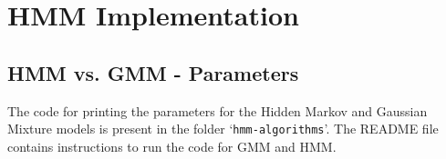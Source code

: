 \documentclass[parskip=half]{scrartcl}
\begin{document}


\newpage


\section{HMM Implementation} %
\label{sec:hmm_implementation}


    \subsection{HMM vs. GMM - Parameters} %
    \label{sub:hmm_vs_gmm_parameters}

        The code for printing the parameters for the Hidden Markov and Gaussian Mixture models is present in the folder `\texttt{hmm-algorithms}'. The README file contains instructions to run the code for GMM and HMM.
\end{document}
